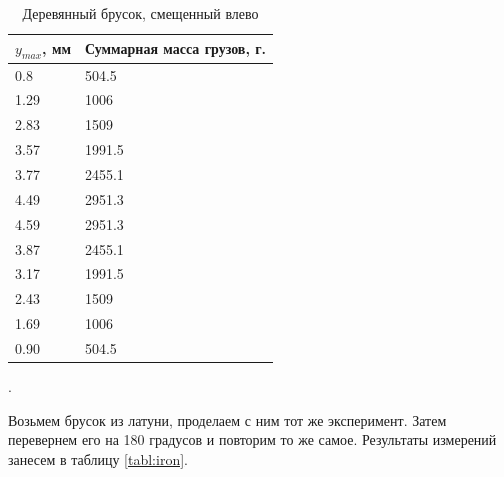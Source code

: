 \documentclass[a4paper, 12pt]{article}
\newcounter{Points}
\newcommand{\point}{\arabic{Points}. \addtocounter{Points}{1}}
\begin{document}
\begin{table}[!h]
    \centering
    \begin{tabular}{|l | l|}
        \hline 
        $y_{max}$, мм & Суммарная масса грузов, г. \\ \hline 
        0.8  & 504.5  \\ \hline
        1.29 & 1006   \\ \hline
        2.83 & 1509   \\ \hline
        3.57 & 1991.5 \\ \hline
        3.77 & 2455.1 \\ \hline
        4.49 & 2951.3 \\ \hline
        4.59 & 2951.3 \\ \hline
        3.87 & 2455.1 \\ \hline
        3.17 & 1991.5 \\ \hline
        2.43 & 1509   \\ \hline
        1.69 & 1006   \\ \hline
        0.90 & 504.5  \\ \hline
    \end{tabular}
    \caption{Деревянный брусок, смещенный влево}
    \label{tabl:wood2}
\end{table}

\point Возьмем брусок из латуни, проделаем с ним тот же эксперимент. Затем перевернем его на 180 градусов и повторим то же самое. Результаты измерений занесем в таблицу \ref{tabl:iron}.
\end{document}
